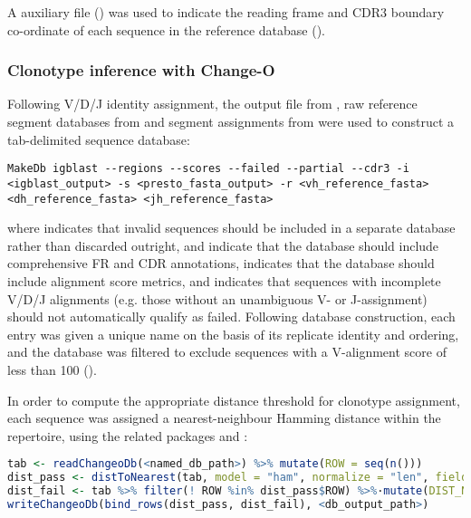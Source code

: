\noindent A \jh auxiliary file () was used to indicate the reading frame and CDR3 boundary co-ordinate of each \jh sequence in the reference database ().

\subsubsection{Clonotype inference with Change-O}
\label{sec:methods_comp_igpreproc_clones}

Following V/D/J identity assignment, the output  file from , raw reference segment databases from  and segment assignments from  were used to construct a tab-delimited  sequence database:

\begin{lstlisting}
MakeDb igblast --regions --scores --failed --partial --cdr3 -i <igblast_output> -s <presto_fasta_output> -r <vh_reference_fasta> <dh_reference_fasta> <jh_reference_fasta>
\end{lstlisting}

\noindent where  indicates that invalid sequences should be included in a separate database rather than discarded outright,  and  indicate that the database should include comprehensive FR and CDR annotations,  indicates that the database should include alignment score metrics, and  indicates that sequences with incomplete V/D/J alignments (e.g. those without an unambiguous V- or J-assignment) should not automatically qualify as failed. Following database construction, each entry was given a unique name on the basis of its replicate identity and ordering, and the database was filtered to exclude sequences with a V-alignment score of less than 100 ().

In order to compute the appropriate distance threshold for clonotype assignment, each sequence was assigned a nearest-neighbour Hamming distance within the repertoire, using the related  packages  and  \parencite{gupta2015changeo}:

\begin{lstlisting}[language=R]
tab <- readChangeoDb(<named_db_path>) %>% mutate(ROW = seq(n()))
dist_pass <- distToNearest(tab, model = "ham", normalize = "len", fields = "INDIVIDUAL", first = FALSE)
dist_fail <- tab %>% filter(! ROW %in% dist_pass$ROW) %>%·mutate(DIST_NEAREST = NA) 
writeChangeoDb(bind_rows(dist_pass, dist_fail), <db_output_path>)
\end{lstlisting}

